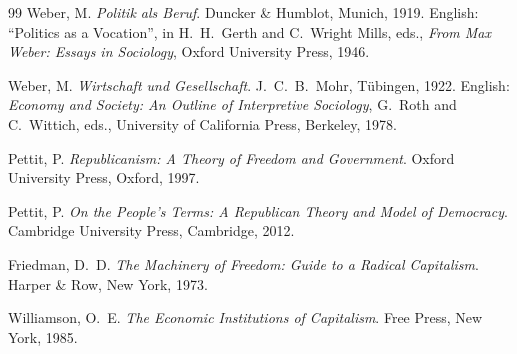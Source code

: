 \documentclass[11pt,a4paper]{article}
\theoremstyle{remark}
\begin{document}
\begin{thebibliography}{99}
Weber, M.
\newblock \emph{Politik als Beruf}.
\newblock Duncker \& Humblot, Munich, 1919.
\newblock English: ``Politics as a Vocation'', in H.~H.~Gerth and
  C.~Wright Mills, eds., \emph{From Max Weber: Essays in
  Sociology}, Oxford University Press, 1946.

Weber, M.
\newblock \emph{Wirtschaft und Gesellschaft}.
\newblock J.~C.~B.~Mohr, T\"ubingen, 1922.
\newblock English: \emph{Economy and Society: An Outline of
  Interpretive Sociology}, G.~Roth and C.~Wittich, eds.,
  University of California Press, Berkeley, 1978.

Pettit, P.
\newblock \emph{Republicanism: A Theory of Freedom and Government}.
\newblock Oxford University Press, Oxford, 1997.

Pettit, P.
\newblock \emph{On the People's Terms: A Republican Theory and
  Model of Democracy}.
\newblock Cambridge University Press, Cambridge, 2012.

Friedman, D.~D.
\newblock \emph{The Machinery of Freedom: Guide to a Radical
  Capitalism}.
\newblock Harper \& Row, New York, 1973.

Williamson, O.~E.
\newblock \emph{The Economic Institutions of Capitalism}.
\newblock Free Press, New York, 1985.

\end{thebibliography}
\end{document}
